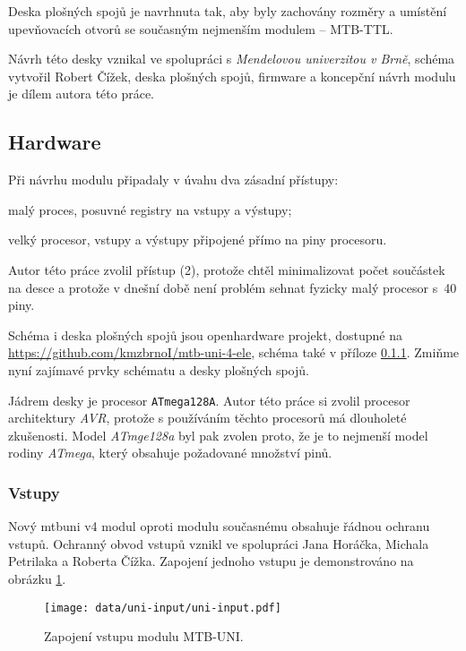 Deska plošných spojů je navrhnuta tak, aby byly zachovány rozměry a umístění
upevňovacích otvorů se současným nejmenším modulem – MTB-TTL.

Návrh této desky vznikal ve spolupráci s \textit{Mendelovou univerzitou v Brně},
schéma vytvořil Robert Čížek, deska plošných spojů, firmware a koncepční návrh
modulu je dílem autora této práce.


\subsection{Hardware}

Při návrhu modulu připadaly v úvahu dva zásadní přístupy:

\begin{compactenum}
\item malý proces, posuvné registry na vstupy a výstupy;
\item velký procesor, vstupy a výstupy připojené přímo na piny procesoru.
\end{compactenum}

Autor této práce zvolil přístup (2), protože chtěl minimalizovat počet
součástek na desce a protože v dnešní době není problém sehnat fyzicky malý
procesor s~40 piny.

Schéma i deska plošných spojů jsou openhardware projekt, dostupné na
\url{https://github.com/kmzbrnoI/mtb-uni-4-ele}, schéma také v příloze
\ref{}. Zmiňme nyní zajímavé prvky schématu a desky plošných spojů.

Jádrem desky je procesor \texttt{ATmega128A}. Autor této práce si zvolil
procesor architektury \textit{AVR}, protože s používáním těchto procesorů má
dlouholeté zkušenosti. Model \textit{ATmge128a} byl pak zvolen proto, že je to
nejmenší model rodiny \textit{ATmega}, který obsahuje požadované množství pinů.

\subsubsection{Vstupy}

Nový \gls{mtbuni} v4 modul oproti modulu současnému obsahuje řádnou ochranu
vstupů. Ochranný obvod vstupů vznikl ve spolupráci Jana Horáčka, Michala
Petrilaka a Roberta Čížka. Zapojení jednoho vstupu je demonstrováno na obrázku
\ref{fig:mtbuni-input}.

\begin{figure}[ht]
\texttt{[image: data/uni-input/uni-input.pdf]}
\caption{Zapojení vstupu modulu MTB-UNI.}
\label{fig:mtbuni-input}
\end{figure}

